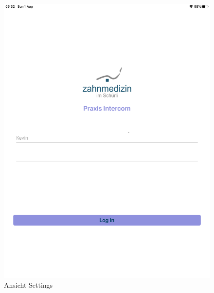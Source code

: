 \begin{figure}[h]
    \centering
    \begin{minipage}[b]{0.4\textwidth}
        \includegraphics[width=\textwidth]{graphics/screenshots/placeholder}
        \caption{Ansicht Settings}
    \end{minipage}
    \hfill
    \begin{minipage}[b]{0.4\textwidth}

\end{minipage}
\end{figure}

